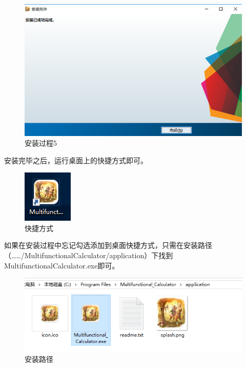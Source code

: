 \documentclass[UTF8]{ctexart}
\begin{document}
\begin{figure}[H]
\centering
\includegraphics[scale=0.5]{image/pic005.png}
\caption{安装过程5}
\label{fig:pic005}
\end{figure}

安装完毕之后，运行桌面上的快捷方式即可。

\begin{figure}[H]
\centering
\includegraphics[scale=0.45]{image/pic006.png}
\caption{快捷方式}
\label{fig:pic006}
\end{figure}

如果在安装过程中忘记勾选添加到桌面快捷方式，只需在安装路径
（……/MultifunctionalCalculator/application）下找到MultifunctionalCalculator.exe即可。

\begin{figure}[H]
\centering
\includegraphics[scale=0.7]{image/pic007.png}
\caption{安装路径}
\label{fig:pic007}
\end{figure}


\end{document}
